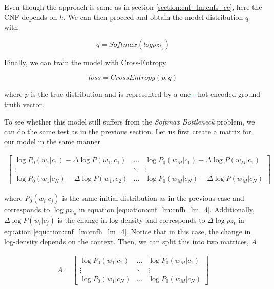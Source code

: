 Even though the approach is same as in section \ref{section:cnf_lm:cnfs_ce}, here the CNF depends on $ h $. We can then proceed and obtain the model distribution $ q $ with

\begin{displaymath}
    q = Softmax(log pz_{t_1})
\end{displaymath}

Finally, we can train the model with Cross-Entropy

\begin{displaymath}
    loss = CrossEntropy(p, q)
\end{displaymath}

where $ p $ is the true distribution and is represented by a one \textcolor{red}{-} hot encoded ground truth vector.

To see whether this model still suffers from the \emph{Softmax Bottleneck} problem, we can do the same test as in the previous section. Let us first create a matrix for our model in the same manner

\begin{displaymath}
    \begin{matrix}
    \begin{bmatrix}
       \log P_0(w_1 | c_1) - \Delta \log P(w_1, c_1) & \hdots & \log P_0(w_M | c_1) - \Delta \log P(w_M | c_1)  \\
       \vdots & \ddots & \vdots \\
       \log P_0(w_1 | c_N) - \Delta \log P(w_1, c_2) & \hdots & \log P_0(w_M | c_N) - \Delta \log P(w_M | c_N)
      \end{bmatrix}
    \end{matrix}
\end{displaymath}

where $ P_0(w_i | c_j) $ is the same initial distribution as in the previous case and corresponds to $ \log pz_{t_0} $ in equation \ref{equation:cnf_lm:cnfh_lm_4}. Additionally, $ \Delta \log P(w_i | c_j) $ is the change in log-density and corresponds to $ \Delta \log pz_t $ in equation \ref{equation:cnf_lm:cnfh_lm_4}. Notice that in this case, the change in log-density depends on the context. Then, we can split this into two matrices, $ A $

\begin{displaymath}
    \begin{matrix}
    A = \begin{bmatrix}
       \log P_0(w_1 | c_1) & \hdots & \log P_0(w_M | c_1) \\
       \vdots & \ddots & \vdots \\
       \log P_0(w_1 | c_N) & \hdots & \log P_0(w_M | c_N)
      \end{bmatrix}
    \end{matrix}
\end{displaymath}

